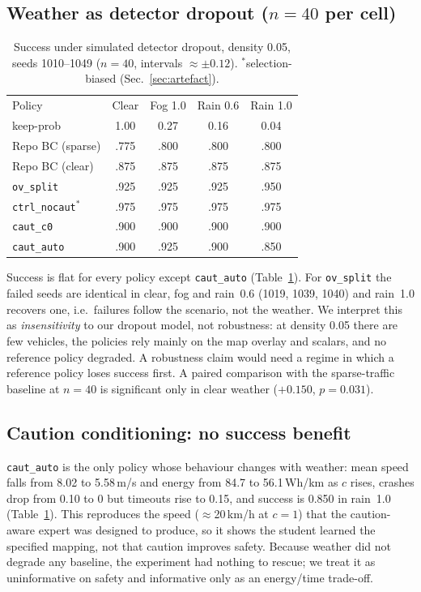 \documentclass[conference]{IEEEtran}
\newcommand{\ovs}{\texttt{ov\_split}}
\newcommand{\ctrl}{\texttt{ctrl\_nocaut}}
\newcommand{\cautc}{\texttt{caut\_c0}}
\newcommand{\cauta}{\texttt{caut\_auto}}
\begin{document}
\subsection{Weather as detector dropout ($n{=}40$ per cell)}\label{sec:weather}
\begin{table}[t]
\caption{Success under simulated detector dropout, density 0.05, seeds 1010--1049 ($n{=}40$, intervals $\approx\pm0.12$). $^\ast$selection-biased (Sec.~\ref{sec:artefact}).}
\label{tab:weather}
\centering\small
\setlength{\tabcolsep}{3pt}
\begin{tabular}{lcccc}
\toprule
Policy & Clear & Fog 1.0 & Rain 0.6 & Rain 1.0\\
keep-prob & 1.00 & 0.27 & 0.16 & 0.04\\
\midrule
Repo BC (sparse) & .775 & .800 & .800 & .800\\
Repo BC (clear) & .875 & .875 & .875 & .875\\
\ovs & .925 & .925 & .925 & .950\\
\ctrl$^\ast$ & .975 & .975 & .975 & .975\\
\cautc & .900 & .900 & .900 & .900\\
\cauta & .900 & .925 & .900 & .850\\
\bottomrule
\end{tabular}
\end{table}
Success is flat for every policy except \cauta{} (Table~\ref{tab:weather}). For \ovs{} the failed seeds are identical in clear, fog and rain~0.6 (1019, 1039, 1040) and rain~1.0 recovers one, i.e.\ failures follow the scenario, not the weather. We interpret this as \emph{insensitivity} to our dropout model, not robustness: at density 0.05 there are few vehicles, the policies rely mainly on the map overlay and scalars, and no reference policy degraded. A robustness claim would need a regime in which a reference policy loses success first. A paired comparison with the sparse-traffic baseline at $n{=}40$ is significant only in clear weather ($+0.150$, $p=0.031$).

\subsection{Caution conditioning: no success benefit}\label{sec:caution}
\cauta{} is the only policy whose behaviour changes with weather: mean speed falls from 8.02 to 5.58\,m/s and energy from 84.7 to 56.1\,Wh/km as $c$ rises, crashes drop from 0.10 to 0 but timeouts rise to 0.15, and success is 0.850 in rain~1.0 (Table~\ref{tab:weather}). This reproduces the speed ($\approx$20\,km/h at $c{=}1$) that the caution-aware expert was designed to produce, so it shows the student learned the specified mapping, not that caution improves safety. Because weather did not degrade any baseline, the experiment had nothing to rescue; we treat it as uninformative on safety and informative only as an energy/time trade-off.
\end{document}

